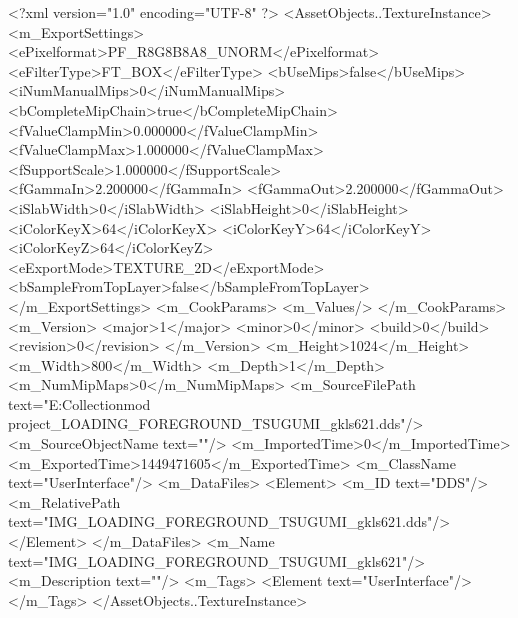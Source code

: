 <?xml version="1.0" encoding="UTF-8" ?>
<AssetObjects..TextureInstance>
	<m_ExportSettings>
		<ePixelformat>PF_R8G8B8A8_UNORM</ePixelformat>
		<eFilterType>FT_BOX</eFilterType>
		<bUseMips>false</bUseMips>
		<iNumManualMips>0</iNumManualMips>
		<bCompleteMipChain>true</bCompleteMipChain>
		<fValueClampMin>0.000000</fValueClampMin>
		<fValueClampMax>1.000000</fValueClampMax>
		<fSupportScale>1.000000</fSupportScale>
		<fGammaIn>2.200000</fGammaIn>
		<fGammaOut>2.200000</fGammaOut>
		<iSlabWidth>0</iSlabWidth>
		<iSlabHeight>0</iSlabHeight>
		<iColorKeyX>64</iColorKeyX>
		<iColorKeyY>64</iColorKeyY>
		<iColorKeyZ>64</iColorKeyZ>
		<eExportMode>TEXTURE_2D</eExportMode>
		<bSampleFromTopLayer>false</bSampleFromTopLayer>
	</m_ExportSettings>
	<m_CookParams>
		<m_Values/>
	</m_CookParams>
	<m_Version>
		<major>1</major>
		<minor>0</minor>
		<build>0</build>
		<revision>0</revision>
	</m_Version>
	<m_Height>1024</m_Height>
	<m_Width>800</m_Width>
	<m_Depth>1</m_Depth>
	<m_NumMipMaps>0</m_NumMipMaps>
	<m_SourceFilePath text="E:\My Collection\Pictures\BanG mod project\AG\DDS\LeaderFallback\IMG_LOADING_FOREGROUND_TSUGUMI_gkls621.dds"/>
	<m_SourceObjectName text=""/>
	<m_ImportedTime>0</m_ImportedTime>
	<m_ExportedTime>1449471605</m_ExportedTime>
	<m_ClassName text="UserInterface"/>
	<m_DataFiles>
		<Element>
			<m_ID text="DDS"/>
			<m_RelativePath text="IMG_LOADING_FOREGROUND_TSUGUMI_gkls621.dds"/>
		</Element>
	</m_DataFiles>
	<m_Name text="IMG_LOADING_FOREGROUND_TSUGUMI_gkls621"/>
	<m_Description text=""/>
	<m_Tags>
		<Element text="UserInterface"/>
	</m_Tags>
</AssetObjects..TextureInstance>

